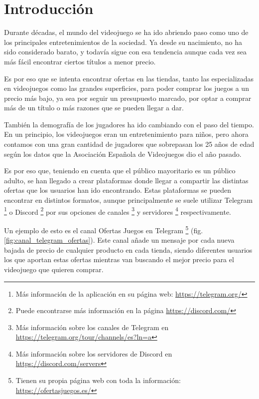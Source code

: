 \chapter{Introducción}

Durante décadas, el mundo del videojuego se ha ido abriendo paso como uno de los principales entretenimientos de la sociedad. Ya desde su nacimiento, 
no ha sido considerado barato, y todavía sigue con esa tendencia aunque cada vez sea más fácil encontrar ciertos títulos a menor precio.

Es por eso que se intenta encontrar ofertas en las tiendas, tanto las especializadas en videojuegos como las grandes superficies, para poder comprar 
los juegos a un precio más bajo, ya sea por seguir un presupuesto marcado, por optar a comprar más de un título o más razones que se pueden llegar a 
dar.

También la demografía de los jugadores ha ido cambiando con el paso del tiempo. En un principio, los videojuegos eran un entretenimiento para niños, pero 
ahora contamos con una gran cantidad de jugadores que sobrepasan los 25 años de edad según los datos que la Asociación Española de Videojuegos \cite{aevi} 
dio el año pasado.

Es por eso que, teniendo en cuenta que el público mayoritario es un público adulto, se han llegado a crear plataformas donde llegar a compartir las 
distintas ofertas que los usuarios han ido encontrando. Estas plataformas se pueden encontrar en distintos formatos, aunque principalmente se suele 
utilizar Telegram \footnote{Más información de la aplicación en su página web: \url{https://telegram.org/}} o Discord \footnote{Puede encontrarse más 
información en la página \url{https://discord.com/}} por sus opciones de canales \footnote{Más información sobre los canales de Telegram en 
\url{https://telegram.org/tour/channels/es?ln=a}} y servidores \footnote{Más información sobre los servidores de Discord en 
\url{https://discord.com/servers}} respectivamente.

Un ejemplo de esto es el canal Ofertas Juegos en Telegram \footnote{Tienen su propia página web con toda la información: \url{https://ofertasjuegos.es/}} 
(fig. \ref{fig:canal_telegram_ofertas}). Este canal añade un mensaje por cada nueva bajada de precio de cualquier producto en cada tienda, siendo 
diferentes usuarios los que aportan estas ofertas mientras van buscando el mejor precio para el videojuego que quieren comprar.

